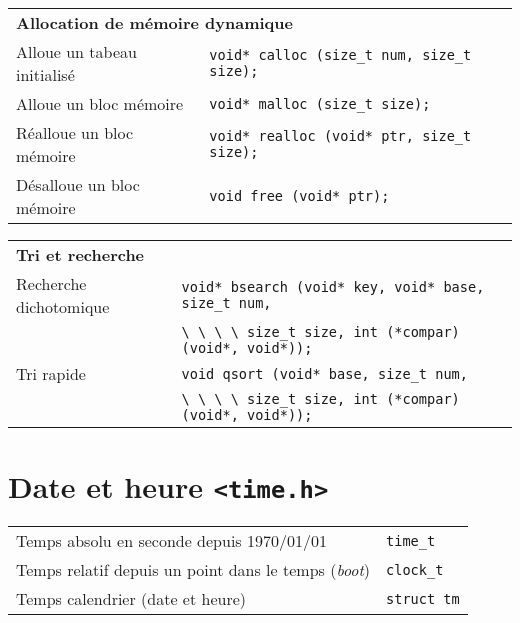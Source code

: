 \documentclass{article}
\newcommand{\cd}{\lstinline}
\begin{document}
\begin{multicols*}{3}
\begin{tabularx}{\linewidth}{Xl}
  \multicolumn{2}{l}{\bf Allocation de mémoire dynamique} \rule{0pt}{3ex} \\
  Alloue un tabeau initialisé & \cd{void* calloc (size_t num, size_t size);} \\
  Alloue un bloc mémoire & \cd{void* malloc (size_t size);} \\
  Réalloue un bloc mémoire & \cd{void* realloc (void* ptr, size_t size);} \\
  Désalloue un bloc mémoire & \cd{void free (void* ptr);} \\
\end{tabularx}
\begin{tabularx}{\linewidth}{Xl}
  \multicolumn{2}{l}{\bf Tri et recherche} \rule{0pt}{3ex} \\
  Recherche dichotomique & \cd{void* bsearch (void* key, void* base, size_t num,} \\
                         & \cd{\ \ \ \ size_t size, int (*compar)(void*, void*));} \\
  Tri rapide             & \cd{void qsort (void* base, size_t num,} \\
                         & \cd{\ \ \ \ size_t size, int (*compar)(void*, void*));} \\
\end{tabularx}

\section*{Date et heure \texttt{<time.h>}}
\begin{tabularx}{\linewidth}{Xl}
  Temps absolu en seconde depuis 1970/01/01 & \cd{time_t} \\
  Temps relatif depuis un point dans le temps (\emph{boot}) & \cd{clock_t} \\
  Temps calendrier (date et heure) & \cd{struct tm} \\
\end{tabularx}


\end{multicols*}
\end{document}
